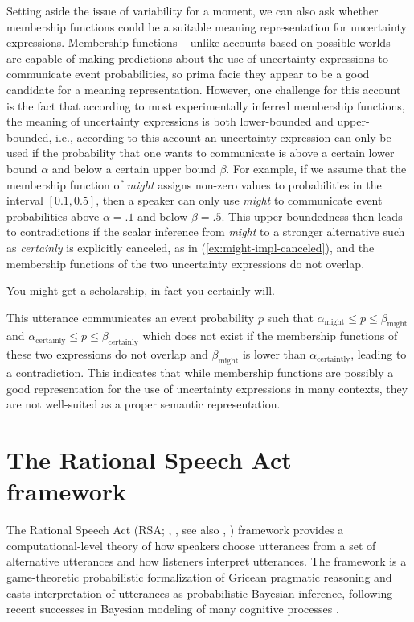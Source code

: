 Setting aside the issue of variability for a moment, we can also ask whether membership functions could be a suitable 
meaning representation for uncertainty expressions. Membership functions -- unlike accounts based on possible worlds --
are capable of making predictions about the use of uncertainty expressions to communicate event probabilities, so prima facie
they appear to be a good candidate for a meaning representation. However, one challenge for this account is the fact that
according to most experimentally inferred membership functions, the meaning of uncertainty expressions is both lower-bounded and upper-bounded,
i.e., according to this account an uncertainty expression can only be used if the probability that one wants to communicate is above a certain lower 
bound $\alpha$ and below a certain upper bound $\beta$. For example, if we assume that the membership function of \textit{might} assigns
non-zero values to probabilities in the interval $[ 0.1,0.5 ]$, then a speaker can only use \textit{might} to communicate event probabilities above 
$\alpha=.1$ and  below $\beta=.5$. This upper-boundedness then leads to contradictions if the scalar inference from \textit{might} to a stronger 
alternative such as \textit{certainly} is explicitly canceled, as in (\ref{ex:might-impl-canceled}), and the membership functions of the two 
uncertainty expressions do not overlap.
\begin{exe}
\ex \label{ex:might-impl-canceled} You might get a scholarship, in fact you certainly will. 
\end{exe}   
This utterance communicates an event probability $p$ such that $\alpha_{\mbox{might}} \le p \le \beta_{\mbox{might}}$ and 
$\alpha_{\mbox{certainly}} \le p \le \beta_{\mbox{certainly}}$ which does not exist if the membership functions of these two expressions
do not overlap and  $\beta_{\mbox{might}}$  is lower than $\alpha_{\mbox{certaintly}}$, leading to a contradiction. This indicates that while
membership functions are possibly a good representation for the use of uncertainty expressions in many contexts, they are not well-suited
as a proper semantic representation. 



\section{The Rational Speech Act framework}

The Rational Speech Act (RSA; \citeauthor{Goodman2016}, \citeyear{Goodman2016}, see also \citeauthor{Franke2016}, \citeyear{Franke2016}) framework provides a computational-level
theory of how speakers choose utterances from a set of alternative utterances and how listeners interpret utterances. The framework is
a game-theoretic probabilistic formalization of Gricean \cite{Grice1975} pragmatic reasoning and casts interpretation of utterances as probabilistic Bayesian
inference, following recent successes in Bayesian modeling of many cognitive processes . 


